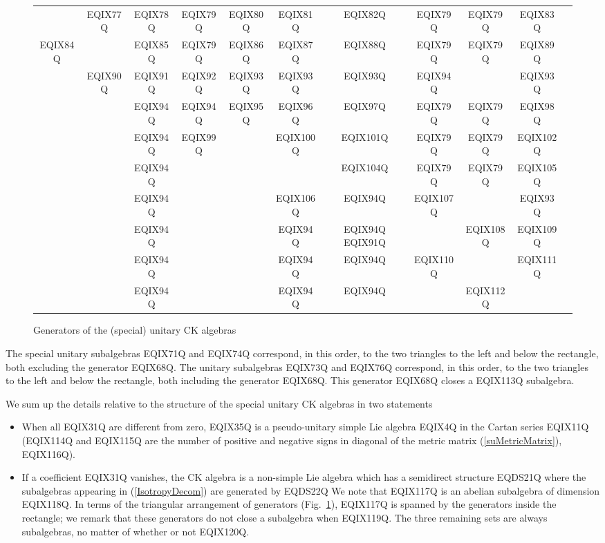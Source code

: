 \begin{figure}[ht]
\begin{center}
\begin{tabular}{ccccc|cccccc}
& EQIX77Q&EQIX78Q&EQIX79Q&EQIX80Q&
   EQIX81Q&EQIX82Q&EQIX79Q&EQIX79Q&EQIX83Q\\
EQIX84Q && EQIX85Q&EQIX79Q&EQIX86Q&
   EQIX87Q&EQIX88Q& EQIX79Q&EQIX79Q&EQIX89Q\\
& EQIX90Q &EQIX91Q&EQIX92Q&EQIX93Q&
   EQIX93Q&EQIX93Q&EQIX94Q&&EQIX93Q\\
& &EQIX94Q&EQIX94Q&EQIX95Q&  EQIX96Q&EQIX97Q&
  EQIX79Q&EQIX79Q&EQIX98Q\\
& &EQIX94Q& EQIX99Q &&  EQIX100Q&EQIX101Q&
   EQIX79Q&EQIX79Q&EQIX102Q\\
\cline{6-10}
& &EQIX94Q&\multicolumn{2}{c}{\,} EQIX103Q
   &&EQIX104Q& EQIX79Q&EQIX79Q&EQIX105Q\\
& &EQIX94Q&\multicolumn{2}{c}{\,}&  EQIX106Q&
  EQIX94Q& EQIX107Q&&EQIX93Q\\
& &EQIX94Q&\multicolumn{2}{c}{\,}&  EQIX94Q&
  EQIX94Q EQIX91Q&&EQIX108Q&EQIX109Q\\
& &EQIX94Q&\multicolumn{2}{c}{\,}&  EQIX94Q&
  EQIX94Q &EQIX110Q&&EQIX111Q\\
& &EQIX94Q&\multicolumn{2}{c}{\,}&  EQIX94Q& EQIX94Q &&EQIX112Q\\
\end{tabular}
\end{center}
\caption{Generators of the (special) unitary CK algebras}
\label{fig2.1}
\end{figure}

The special unitary subalgebras EQIX71Q  and
EQIX74Q correspond, in this order, to the
two triangles to the left and below the rectangle, both excluding the
generator EQIX68Q.  The unitary subalgebras
EQIX73Q  and EQIX76Q
correspond, in this order, to the two triangles to the left and
below the rectangle, both including the generator EQIX68Q.
This generator EQIX68Q closes a EQIX113Q subalgebra.

We sum up the details relative to the structure of the special unitary
CK algebras in two statements
\begin{itemize}
\item
When all EQIX31Q  are different from zero,
EQIX35Q is a  pseudo-unitary simple Lie algebra
EQIX4Q in the  Cartan series EQIX11Q (EQIX114Q and EQIX115Q are the number
of positive and negative signs in diagonal of the metric matrix
(\ref{suMetricMatrix}), EQIX116Q).

\item
If a coefficient EQIX31Q vanishes, the CK algebra is a
non-simple Lie algebra which has a semidirect structure
EQDS21Q
where the subalgebras appearing in (\ref{IsotropyDecom}) are
generated by
EQDS22Q
We note that EQIX117Q is an abelian subalgebra of dimension EQIX118Q. In
terms of the triangular arrangement of generators (Fig.~\ref{fig2.1}), EQIX117Q
is spanned by the generators inside the rectangle; we remark that these
generators do not close a subalgebra when EQIX119Q. The three remaining
sets are always subalgebras, no matter of whether or not EQIX120Q.
\end{itemize}

